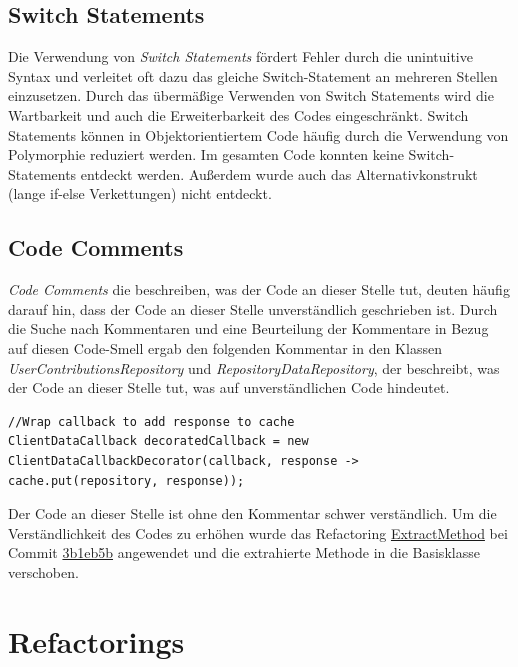 \documentclass[12pt]{article}
\begin{document}
\subsection{Switch Statements}

Die Verwendung von \textit{Switch Statements} fördert Fehler durch die unintuitive Syntax und verleitet oft dazu das gleiche Switch-Statement an mehreren Stellen einzusetzen.
Durch das übermäßige Verwenden von Switch Statements wird die Wartbarkeit und auch die Erweiterbarkeit des Codes eingeschränkt.
Switch Statements können in Objektorientiertem Code häufig durch die Verwendung von Polymorphie reduziert werden.
\newline
\newline
Im gesamten Code konnten keine Switch-Statements entdeckt werden. Außerdem wurde auch das Alternativkonstrukt (lange if-else Verkettungen) nicht entdeckt.

\subsection{Code Comments}

\textit{Code Comments} die beschreiben, was der Code an dieser Stelle tut, deuten häufig darauf hin, dass der Code an dieser Stelle unverständlich geschrieben ist.
\newline
\newline
Durch die Suche nach Kommentaren und eine Beurteilung der Kommentare in Bezug auf diesen Code-Smell ergab den folgenden Kommentar in den Klassen \textit{UserContributionsRepository} und \textit{RepositoryDataRepository}, der beschreibt, was der Code an dieser Stelle tut, was auf unverständlichen Code hindeutet.
\begin{lstlisting}
//Wrap callback to add response to cache
ClientDataCallback decoratedCallback = new ClientDataCallbackDecorator(callback, response ->  cache.put(repository, response));
\end{lstlisting}
Der Code an dieser Stelle ist ohne den Kommentar schwer verständlich. Um die Verständlichkeit des Codes zu erhöhen wurde das Refactoring {\hyperref[sec:ExtractMethod_Repository]{ExtractMethod}} bei Commit \href{https://github.com/lukaspanni/OpenSourceStats/commit/3b1eb5bf6750c3ccaeb05962ec8a8ae743adbf2c} {3b1eb5b} angewendet und die extrahierte Methode in die Basisklasse verschoben.


\newpage
\section{Refactorings}
\label{sec:Refactorings}
\end{document}

